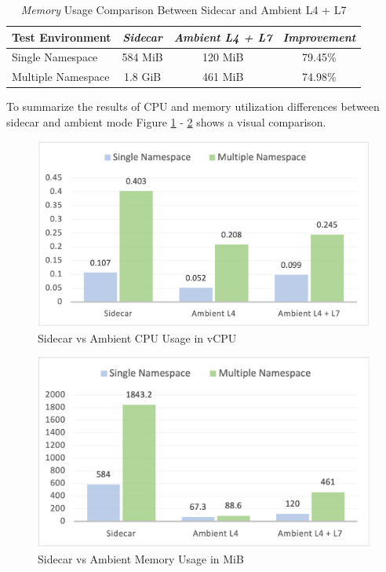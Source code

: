 \begin{table}[ht!]
  \centering
  \begin{tabular}{ |l|c|c|c| }
    \hline
    \textbf{Test Environment} & \textbf{\textit{Sidecar}} & \textbf{\textit{Ambient L4 + L7}} & \textbf{\textit{Improvement}}\\ \hline
    Single Namespace & 584 MiB & 120 MiB & 79.45\% \\ \hline
    Multiple Namespace & 1.8 GiB & 461 MiB & 74.98\% \\ \hline
  \end{tabular}
  \caption{\textit{Memory} Usage Comparison Between Sidecar and Ambient L4 + L7}
  \label{res:sidecarMemVsL4L7}
\end{table}

To summarize the results of CPU and memory utilization differences between sidecar and ambient mode Figure \ref{res:excelVisualCPU} - \ref{res:excelVisualMem} shows a visual comparison.

\begin{figure}[ht!]
  \centering
  \includegraphics[width=0.62\linewidth]{resources/excelVisualCpu.png}
  \caption{Sidecar vs Ambient CPU Usage in vCPU}
  \label{res:excelVisualCPU}
\end{figure}

\begin{figure}[ht!]
  \centering
  \includegraphics[width=0.62\linewidth]{resources/excelVisualMem.png}
  \caption{Sidecar vs Ambient Memory Usage in MiB}
  \label{res:excelVisualMem}
\end{figure}

